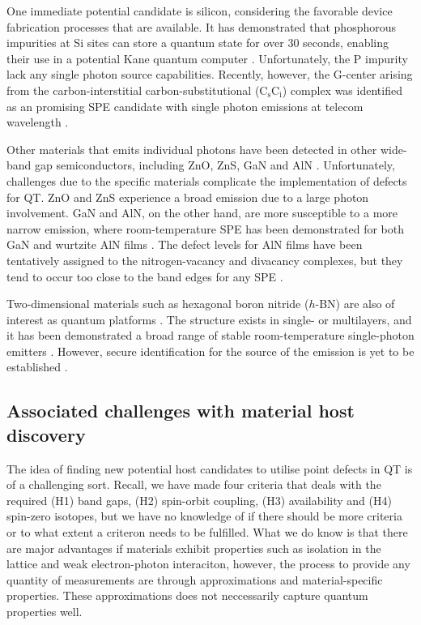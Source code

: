 One immediate potential candidate is silicon, considering the favorable device fabrication processes that are available. It has demonstrated that phosphorous impurities at Si sites can store a quantum state for over $30$ seconds, enabling their use in a potential Kane quantum computer \cite{Zhang2020}. Unfortunately, the P impurity lack any single photon source capabilities. Recently, however, the G-center arising from the carbon-interstitial carbon-substitutional ($\text{C}_{\text{s}}\text{C}_{\text{i}}$) complex was identified as an promising SPE candidate with single photon emissions at telecom wavelength \cite{Redjem2020}.

Other materials that emits individual photons have been detected in other wide-band gap semiconductors, including ZnO, ZnS, GaN and AlN \cite{Zhang2020}. Unfortunately, challenges due to the specific materials complicate the implementation of defects for QT. ZnO and ZnS experience a broad emission due to a large photon involvement. GaN and AlN, on the other hand, are more susceptible to a more narrow emission, where room-temperature SPE has been demonstrated for both GaN \cite{Berhane2018} and wurtzite AlN films \cite{Xue2020}. The defect levels for AlN films have been tentatively assigned to the nitrogen-vacancy and divacancy complexes, but they tend to occur too close to the band edges for any SPE \cite{Zhang2020, Varley2016}.

Two-dimensional materials such as hexagonal boron nitride ($h$-BN) are also of interest as quantum platforms \cite{Toth2019}. The structure exists in single- or multilayers, and it has been demonstrated a broad range of stable room-temperature single-photon emitters \cite{Tran2016, Tran2016a}. However, secure identification for the source of the emission is yet to be established \cite{Weston2018, Abdi2018}.

\subsection{Associated challenges with material host discovery}

The idea of finding new potential host candidates to utilise point defects in QT is of a challenging sort. Recall, we have made four criteria that deals with the required (H1) band gaps, (H2) spin-orbit coupling, (H3) availability and (H4) spin-zero isotopes, but we have no knowledge of if there should be more criteria or to what extent a criteron needs to be fulfilled. What we do know is that there are major advantages if materials exhibit properties such as isolation in the lattice and weak electron-photon interaciton, however, the process to provide any quantity of measurements are through approximations and material-specific properties. These approximations does not neccessarily capture quantum properties well.

